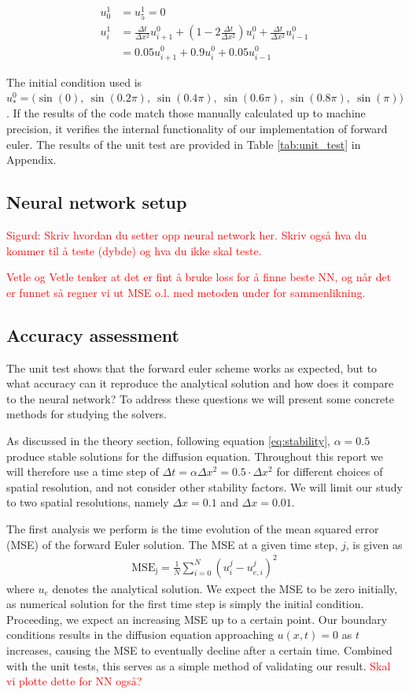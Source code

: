 \documentclass[12pt]{extarticle}
\begin{document}
\begin{align*}
	u_0^1 &= u_5^1 = 0 \\
	u_i^1 &= \frac{\Delta t}{\Delta x^2}u_{i+1}^0 + (1 - 2\frac{\Delta t}{\Delta x^2})u_i^0 + \frac{\Delta t}{\Delta x^2}u_{i-1}^0 \\
	&= 0.05u_{i+1}^0 + 0.9u_i^0 + 0.05u_{i-1}^0
\end{align*}

The initial condition used is $u_*^0 = \big(\sin(0),\:\sin(0.2\pi),\:\sin(0.4\pi),\:\sin(0.6\pi), \:\sin(0.8\pi),\:\sin(\pi)\big)$. If the results of the code match those manually calculated up to machine precision, it verifies the internal functionality of our implementation of forward euler. The results of the unit test are provided in Table \ref{tab:unit_test} in Appendix.



\subsection*{Neural network setup}
\textcolor{red}{Sigurd: Skriv hvordan du setter opp neural network her. Skriv også hva du kommer til å teste (dybde) og hva du ikke skal teste.}

\textcolor{red}{Vetle og Vetle tenker at det er fint å bruke loss for å finne beste NN, og når det er funnet så regner vi ut MSE o.l. med metoden under for sammenlikning.}

\subsection*{Accuracy assessment}
The unit test shows that the forward euler scheme works as expected, but to what accuracy can it reproduce the analytical solution and how does it compare to the neural network? To address these questions we will present some concrete methods for studying the solvers.

As discussed in the theory section, following equation \eqref{eq:stability}, $\alpha=0.5$ produce stable solutions for the diffusion equation. Throughout this report we will therefore use a time step of $\Delta t = \alpha \Delta x^2 = 0.5\cdot \Delta x^2$ for different choices of spatial resolution, and not consider other stability factors. We will limit our study to two spatial resolutions, namely $\Delta x = 0.1$ and $\Delta x = 0.01$.  

The first analysis we perform is the time evolution of the mean squared error (MSE) of the forward Euler solution. The MSE at a given time step, $j$, is given as 
\begin{align} \label{eq:MSE}
	\mathrm{MSE_j} = \frac{1}{N}\sum_{i=0}^N (u_i^j - u_{e,i}^j)^2 
\end{align}
where $u_e$ denotes the analytical solution. We expect the MSE to be zero initially, as numerical solution for the first time step is simply the initial condition. Proceeding, we expect an increasing MSE up to a certain point. Our boundary conditions results in the diffusion equation approaching $u(x,t)=0$ as $t$ increases, causing the MSE to eventually decline after a certain time. Combined with the unit tests, this serves as a simple method of validating our result.  
\textcolor{red}{Skal vi plotte dette for NN også?}
\end{document}
